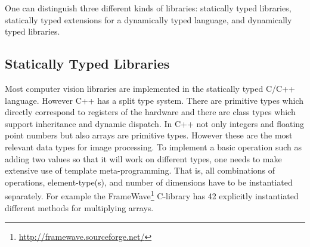 \documentclass[12pt,a4paper,oneside,openright]{book}
\newcommand{\Ie}{That is, }
\begin{document}
\begin{CJK}{UTF8}{}
One can distinguish three different kinds of libraries: statically typed libraries, statically typed extensions for a dynamically typed language, and dynamically typed libraries.

\subsection{Statically Typed Libraries}\label{cha:statically}
Most computer vision libraries are implemented in the statically typed C/C++ language. However C++ has a split type system. There are primitive types which directly correspond to registers of the hardware and there are class types which support inheritance and dynamic dispatch. In C++ not only integers and floating point numbers but also arrays are primitive types. However these are the most relevant data types for image processing. To implement a basic operation such as adding two values so that it will work on different types, one needs to make extensive use of template meta-programming. \Ie all combinations of operations, element-type(s), and number of dimensions have to be instantiated separately. For example the FrameWave\footnote{\url{http://framewave.sourceforge.net/}} C-library has 42 explicitly instantiated different methods for multiplying arrays.


\end{CJK}
\end{document}
